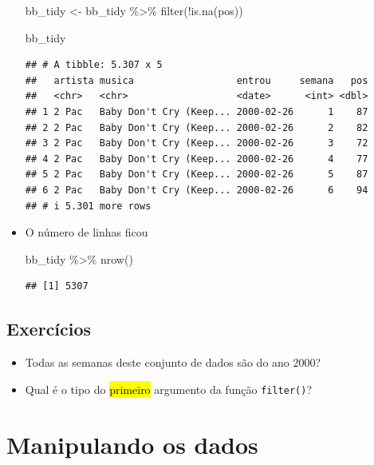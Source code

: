 \documentclass[
  11pt]{report}
\newenvironment{Shaded}{\begin{snugshade}}{\end{snugshade}}
\newcommand{\FunctionTok}[1]{\textcolor[rgb]{0.00,0.00,0.00}{#1}}
\newcommand{\NormalTok}[1]{#1}
\newcommand{\OtherTok}[1]{\textcolor[rgb]{0.56,0.35,0.01}{#1}}
\newcommand{\SpecialCharTok}[1]{\textcolor[rgb]{0.00,0.00,0.00}{#1}}
\renewenvironment{Shaded}{
    \begin{mdframed}[%
      roundcorner=2pt,%
      innerleftmargin=5pt,%
      innerrightmargin=5pt,%
      topline=true,%
      leftline=true,%
      rightline=true,%
      bottomline=true,%
      linewidth=0.5pt,%
      linecolor=black!20,%
      backgroundcolor=black!2,%
      skipabove=2ex,%
      skipbelow=2.5ex%
    ]%
  }
  {
    \end{mdframed}
  }
\begin{document}
\begin{itemize}
\begin{Shaded}
\begin{Highlighting}[]
\NormalTok{bb\_tidy }\OtherTok{\textless{}{-}}\NormalTok{ bb\_tidy }\SpecialCharTok{\%\textgreater{}\%} 
  \FunctionTok{filter}\NormalTok{(}\SpecialCharTok{!}\FunctionTok{is.na}\NormalTok{(pos))}

\NormalTok{bb\_tidy}
\end{Highlighting}
\end{Shaded}

\begin{verbatim}
## # A tibble: 5.307 x 5
##   artista musica                  entrou     semana   pos
##   <chr>   <chr>                   <date>      <int> <dbl>
## 1 2 Pac   Baby Don't Cry (Keep... 2000-02-26      1    87
## 2 2 Pac   Baby Don't Cry (Keep... 2000-02-26      2    82
## 3 2 Pac   Baby Don't Cry (Keep... 2000-02-26      3    72
## 4 2 Pac   Baby Don't Cry (Keep... 2000-02-26      4    77
## 5 2 Pac   Baby Don't Cry (Keep... 2000-02-26      5    87
## 6 2 Pac   Baby Don't Cry (Keep... 2000-02-26      6    94
## # i 5.301 more rows
\end{verbatim}
\item
  O número de linhas ficou

\begin{Shaded}
\begin{Highlighting}[]
\NormalTok{bb\_tidy }\SpecialCharTok{\%\textgreater{}\%} \FunctionTok{nrow}\NormalTok{()}
\end{Highlighting}
\end{Shaded}

\begin{verbatim}
## [1] 5307
\end{verbatim}
\end{itemize}

\hypertarget{exercuxedcios-3}{%
\subsection{Exercícios}\label{exercuxedcios-3}}

\begin{itemize}
\item
  Todas as semanas deste conjunto de dados são do ano $2000$?
\item
  Qual é o tipo do {\hl{primeiro}} argumento da função \texttt{filter()}?
\end{itemize}

\hypertarget{manipulando-os-dados}{%
\section{Manipulando os dados}\label{manipulando-os-dados}}
\end{document}
